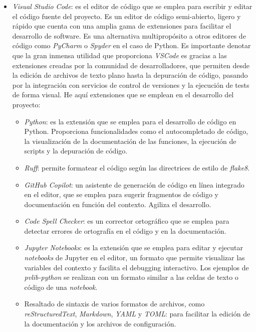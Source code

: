 \begin{itemize}
    \item \textit{Visual Studio Code}: es el editor de código que se emplea para escribir y editar el código fuente del proyecto. Es un editor de código semi-abierto, ligero y rápido que cuenta con una amplia gama de extensiones para facilitar el desarrollo de software. Es una alternativa multipropósito a otros editores de código como \textit{PyCharm} o \textit{Spyder} en el caso de Python. Es importante denotar que la gran inmensa utilidad que proporciona \textit{VSCode} es gracias a las extensiones creadas por la comunidad de desarrolladores, que permiten desde la edición de archivos de texto plano hasta la depuración de código, pasando por la integración con servicios de control de versiones y la ejecución de tests de forma visual. He aquí extensiones que se emplean en el desarrollo del proyecto:
          \begin{itemize}
              \item \textit{Python}: es la extensión que se emplea para el desarrollo de código en Python. Proporciona funcionalidades como el autocompletado de código, la visualización de la documentación de las funciones, la ejecución de scripts y la depuración de código.
              \item \textit{Ruff}: permite formatear el código según las directrices de estilo de \textit{flake8}.
              \item \textit{GitHub Copilot}: un asistente de generación de código en línea integrado en el editor, que se emplea para sugerir fragmentos de código y documentación en función del contexto. Agiliza el desarrollo.
              \item \textit{Code Spell Checker}: es un corrector ortográfico que se emplea para detectar errores de ortografía en el código y en la documentación.
              \item \textit{Jupyter Notebooks}: es la extensión que se emplea para editar y ejecutar \textit{notebooks} de Jupyter en el editor, un formato que permite visualizar las variables del contexto y facilita el debugging interactivo. Los ejemplos de \textit{pvlib-python} se realizan con un formato similar a las celdas de texto o código de una \textit{notebook}.
              \item Resaltado de sintaxis de varios formatos de archivos, como \textit{reStructuredText}, \textit{Markdown}, \textit{YAML} y \textit{TOML}: para facilitar la edición de la documentación y los archivos de configuración.


\end{itemize}
\end{itemize}
